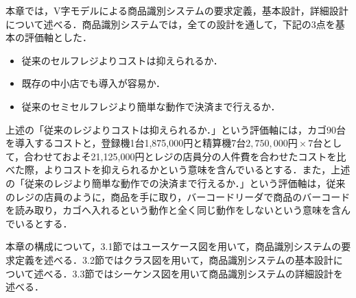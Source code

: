 

本章では，V字モデルによる商品識別システムの要求定義，基本設計，詳細設計について述べる．商品識別システムでは，全ての設計を通して，下記の3点を基本の評価軸とした．

\begin{itemize}
\item 従来のセルフレジよりコストは抑えられるか．
\item 既存の中小店でも導入が容易か．
\item 従来のセミセルフレジより簡単な動作で決済まで行えるか．
\end{itemize}


上述の「従来のレジよりコストは抑えられるか．」という評価軸には，カゴ90台を導入するコストと，登録機1台1,875,000円と精算機7台$2,750,000円\times7台$として，合わせておよそ21,125,000円\cite{super}とレジの店員分の人件費を合わせたコストを比べた際，よりコストを抑えられるかという意味を含んでいるとする．また，上述の「従来のレジより簡単な動作での決済まで行えるか．」という評価軸は，従来のレジの店員のように，商品を手に取り，バーコードリーダで商品のバーコードを読み取り，カゴへ入れるという動作と全く同じ動作をしないという意味を含んでいるとする．


本章の構成について，3.1節ではユースケース図を用いて，商品識別システムの要求定義を述べる．3.2節ではクラス図を用いて，商品識別システムの基本設計について述べる．3.3節ではシーケンス図を用いて商品識別システムの詳細設計を述べる．